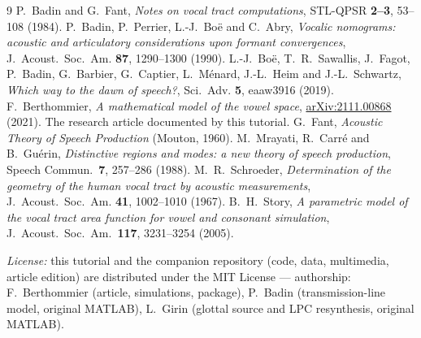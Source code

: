 \documentclass[11pt]{article}
\newcommand{\arxivpaper}{\href{https://arxiv.org/abs/2111.00868}{arXiv:2111.00868}}
\theoremstyle{definition}
\theoremstyle{remark}
\begin{document}
\begin{thebibliography}{9}\small
{}
P.~Badin and G.~Fant, \emph{Notes on vocal tract computations},
STL-QPSR \textbf{2--3}, 53--108 (1984).
P.~Badin, P.~Perrier, L.-J.~Bo\"e and C.~Abry, \emph{Vocalic nomograms:
acoustic and articulatory considerations upon formant convergences},
J.~Acoust.~Soc.~Am. \textbf{87}, 1290--1300 (1990).
L.-J.~Bo\"e, T.~R.~Sawallis, J.~Fagot, P.~Badin, G.~Barbier,
G.~Captier, L.~M\'enard, J.-L.~Heim and J.-L.~Schwartz,
\emph{Which way to the dawn of speech?}, Sci.~Adv. \textbf{5},
eaaw3916 (2019).
F.~Berthommier, \emph{A mathematical model of the vowel space},
\arxivpaper{} (2021).  The research article documented by this tutorial.
G.~Fant, \emph{Acoustic Theory of Speech Production} (Mouton, 1960).
M.~Mrayati, R.~Carr\'e and B.~Gu\'erin, \emph{Distinctive regions and
modes: a new theory of speech production}, Speech Commun.\ \textbf{7},
257--286 (1988).
M.~R.~Schroeder, \emph{Determination of the geometry of the human vocal
tract by acoustic measurements}, J.~Acoust.~Soc.~Am. \textbf{41},
1002--1010 (1967).
B.~H.~Story, \emph{A parametric model of the vocal tract area function
for vowel and consonant simulation}, J.~Acoust.~Soc.~Am.\ \textbf{117},
3231--3254 (2005).
\end{thebibliography}

\vspace{6pt}
\noindent\small\textit{License:} this tutorial and the companion
repository (code, data, multimedia, article edition) are distributed
under the MIT License --- authorship: F.~Berthommier (article,
simulations, package), P.~Badin (transmission-line model, original
MATLAB), L.~Girin (glottal source and LPC resynthesis, original MATLAB).
\end{document}
